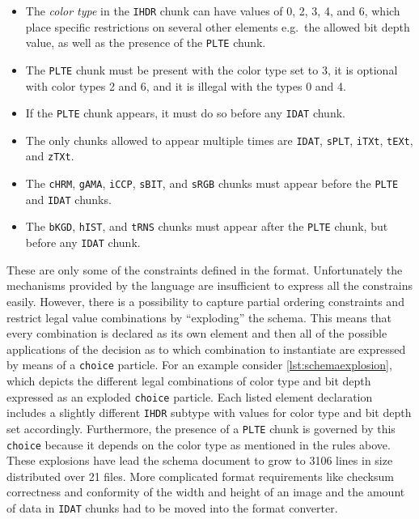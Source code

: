 \begin{itemize}
\item[] The \emph{color type} in the \texttt{IHDR} chunk can have values of 0, 2, 3, 4, and 6, which place
specific restrictions on several other elements e.g.\ the allowed bit depth value, as well as the presence of
the \texttt{PLTE} chunk.

\item[] The \texttt{PLTE} chunk must be present with the color type set to 3, it is optional with color types 2
and 6, and it is illegal with the types 0 and 4.

\item[] If the \texttt{PLTE} chunk appears, it must do so before any \texttt{IDAT} chunk.

\item[] The only chunks allowed to appear multiple times are \texttt{IDAT}, \texttt{sPLT}, \texttt{iTXt},
\texttt{tEXt}, and \texttt{zTXt}.

\item[] The \texttt{cHRM}, \texttt{gAMA}, \texttt{iCCP}, \texttt{sBIT}, and \texttt{sRGB} chunks must appear
before the \texttt{PLTE} and \texttt{IDAT} chunks.

\item[] The \texttt{bKGD}, \texttt{hIST}, and \texttt{tRNS} chunks must appear after the \texttt{PLTE} chunk,
but before any \texttt{IDAT} chunk.
\end{itemize}

These are only some of the constraints defined in the \png format. Unfortunately the mechanisms provided by
the \xsd language are insufficient to express all the constrains easily. However, there is a possibility to
capture partial ordering constraints and restrict legal value combinations by ``exploding'' the schema. This
means that every combination is declared as its own element and then all of the possible applications of the
decision as to which combination to instantiate are expressed by means of a \texttt{choice} particle.
For an example consider \cref{lst:schemaexplosion}, which depicts the different legal combinations of color
type and bit depth expressed as an exploded \texttt{choice} particle. Each listed element declaration includes
a slightly different \texttt{IHDR} subtype with values for color type and bit depth set accordingly.
Furthermore, the presence of a \texttt{PLTE} chunk is governed by this \texttt{choice} because it depends on
the color type as mentioned in the rules above. These explosions have lead the schema document to grow to 3106
lines in size distributed over 21 files. More complicated format requirements like checksum correctness and conformity of
the width and height of an image and the amount of data in \texttt{IDAT} chunks had to be moved into the format
converter.

